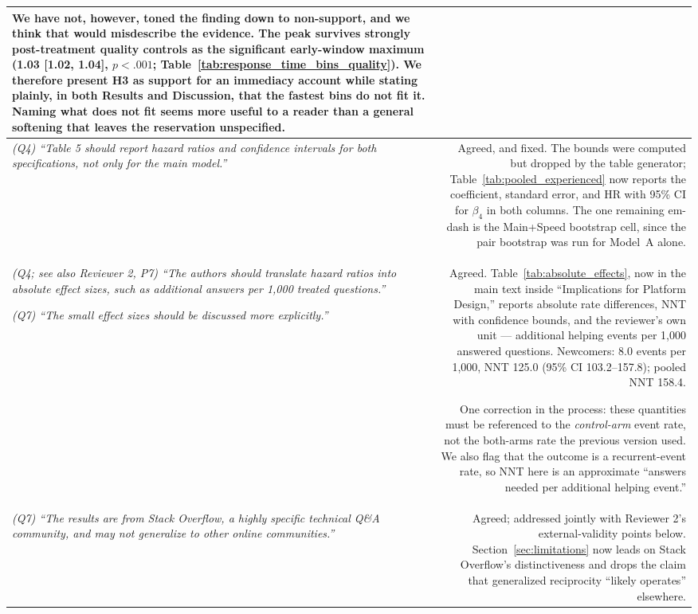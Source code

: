 \documentclass[11pt]{article}
\begin{document}
\begin{longtable}{@{}L R@{}}
We have not, however, toned the finding down to non-support, and we think that would misdescribe the evidence. The peak survives strongly post-treatment quality controls as the significant early-window maximum (1.03 [1.02, 1.04], $p<.001$; Table~\ref{tab:response_time_bins_quality}). We therefore present H3 as support for an immediacy account while stating plainly, in both Results and Discussion, that the fastest bins do not fit it. Naming what does not fit seems more useful to a reader than a general softening that leaves the reservation unspecified. \\
\midrule

\textit{(Q4) ``Table 5 should report hazard ratios and confidence intervals for both specifications, not only for the main model.''} &
Agreed, and fixed. The bounds were computed but dropped by the table generator; Table~\ref{tab:pooled_experienced} now reports the coefficient, standard error, and HR with 95\% CI for $\beta_4$ in both columns. The one remaining em-dash is the Main+Speed bootstrap cell, since the pair bootstrap was run for Model~A alone. \\
\midrule

\textit{(Q4; see also Reviewer 2, P7) ``The authors should translate hazard ratios into absolute effect sizes, such as additional answers per 1,000 treated questions.''}

\textit{(Q7) ``The small effect sizes should be discussed more explicitly.''} &
Agreed. Table~\ref{tab:absolute_effects}, now in the main text inside ``Implications for Platform Design,'' reports absolute rate differences, NNT with confidence bounds, and the reviewer's own unit --- additional helping events per 1{,}000 answered questions. Newcomers: 8.0 events per 1{,}000, NNT 125.0 (95\% CI 103.2--157.8); pooled NNT 158.4.

One correction in the process: these quantities must be referenced to the \emph{control-arm} event rate, not the both-arms rate the previous version used. We also flag that the outcome is a recurrent-event rate, so NNT here is an approximate ``answers needed per additional helping event.'' \\
\midrule

\textit{(Q7) ``The results are from Stack Overflow, a highly specific technical Q\&A community, and may not generalize to other online communities.''} &
Agreed; addressed jointly with Reviewer 2's external-validity points below. Section~\ref{sec:limitations} now leads on Stack Overflow's distinctiveness and drops the claim that generalized reciprocity ``likely operates'' elsewhere. \\
\midrule


\end{longtable}
\end{document}
